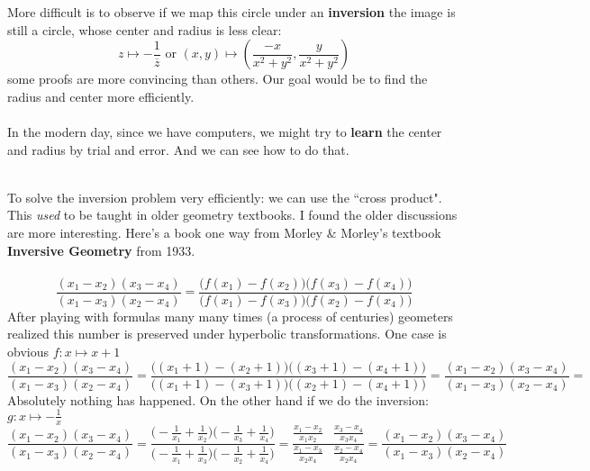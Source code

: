 \documentclass[12pt]{article}
\begin{document}
More difficult is to observe if we map this circle under an \textbf{inversion} the image is still a circle, whose center and radius is less clear:
$$ z \mapsto  - \frac{1}{\overline{z}} \text{ or } (x,y) \mapsto
 \left( \frac{-x}{x^2 + y^2 }, \frac{y}{x^2 + y^2 } \right)  $$
 some proofs are more convincing than others.  Our goal would be to find the radius and center more efficiently. \\ \\
 In the modern day, since we have computers, we might try to \textbf{learn} the center and radius by trial and error.  And we can see how to do that.

\newpage  

 \\ 
To solve the inversion problem very efficiently: we can use the ``cross product".  This \textit{used} to be taught in older geometry textbooks.  I found the older discussions are more interesting.  Here's a book one way from Morley \& Morley's textbook \textbf{Inversive Geometry} from 1933. \\ \\
$$  \frac{(x_1 - x_2)(x_3 - x_4)}{(x_1 - x_3)(x_2 - x_4)} = 
\frac{\big( f(x_1) - f(x_2) \big) \big( f(x_3) - f(x_4) \big) }{
\big( f(x_1) - f(x_3) \big) \big( f(x_2) - f(x_4) \big) }
 $$
After playing with formulas many many times (a process of centuries) geometers realized this number is preserved under hyperbolic transformations.  One case is obvious $f: x \mapsto x+1$
$$  \frac{( x_1 - x_2)(x_3 - x_4)}{(x_1 - x_3)(x_2 - x_4)} = 
 \frac{ \Big(  (x_1 + 1) - (x_2 + 1)\Big) \Big( (x_3 + 1) - (x_4 + 1) \Big) }{  \Big(  (x_1 + 1) - (x_3 + 1)\Big) \Big( (x_2 + 1) - (x_4 + 1) \Big)  } = \frac{( x_1 - x_2)(x_3 - x_4)}{(x_1 - x_3)(x_2 - x_4)} = 
 $$
Absolutely nothing has happened.  On the other hand if we do the inversion: $g: x \mapsto - \frac{1}{x}$
$$  \frac{( x_1 - x_2)(x_3 - x_4)}{(x_1 - x_3)(x_2 - x_4)} = 
 \frac
{ \Big(  - \frac{1}{x_1} + \frac{1}{x_2} \Big)\Big(  - \frac{1}{x_3} + \frac{1}{x_4} \Big)  } { \Big(  - \frac{1}{x_1} + \frac{1}{x_3} \Big)\Big(  - \frac{1}{x_2} + \frac{1}{x_4} \Big)  }
=  
 \frac
{   \frac{x_1 - x_2}{x_1 x_2} \;\;\; \frac{x_3 - x_4}{x_3 x_4}  }
{   \frac{x_1 - x_3}{x_2 x_4} \;\;\; \frac{x_2 - x_4}{x_2 x_4} }
= 
 \frac{( x_1 - x_2)(x_3 - x_4)}{(x_1 - x_3)(x_2 - x_4)}$$
\end{document}
